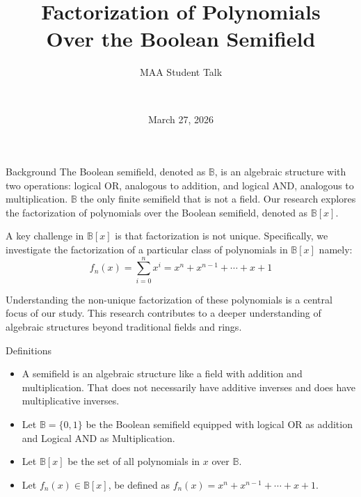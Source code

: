 \documentclass{beamer}
\title[\email]{Factorization of Polynomials\\ Over the Boolean Semifield }
\subtitle{\small MAA Student Talk}
\author[\name]{
    \name \\
    \email
}
\date{March 27, 2026}
\newcommand{\B}{\mathbb{B}}
\begin{document}
    \begin{frame}
        \titlepage
    \end{frame}
    
    \begin{frame}{Background}
        The Boolean semifield, denoted as $\B$, is an algebraic structure with two operations: logical OR, analogous to addition, and
        logical AND, analogous to multiplication. $\B$ the only finite semifield that is not a field. Our research explores the factorization of polynomials over the Boolean semifield, denoted as $\B[x]$.  
        
        A key challenge in $\B[x]$ is that factorization is not unique. Specifically, we investigate the factorization of a particular
        class of polynomials in $\B[x]$ namely: $$f_n(x) = \sum_{i=0}^{n} x^i = x^n + x^{n-1} + \cdots + x + 1$$
        
        Understanding the non-unique factorization of these polynomials is a central focus of our study. This research contributes to a
        deeper understanding of algebraic structures beyond traditional fields and rings. 
    \end{frame}
    
    \begin{frame}{Definitions}
        \begin{itemize}
            \item A semifield is an algebraic structure like a field with addition and multiplication. 
                That does not necessarily have additive inverses and does have multiplicative inverses. 
            \item Let $\B = \{0, 1\}$ be the Boolean semifield equipped with logical OR as addition and Logical AND as Multiplication.  
            \item Let $\B[x]$ be the set of all polynomials in $x$ over $\B$.
            \item Let $f_n(x)\in \B[x]$, be defined as $f_n(x) = x^n +x^{n-1}+\cdots + x +1$.
        \end{itemize}
    \end{frame}
\end{document}
